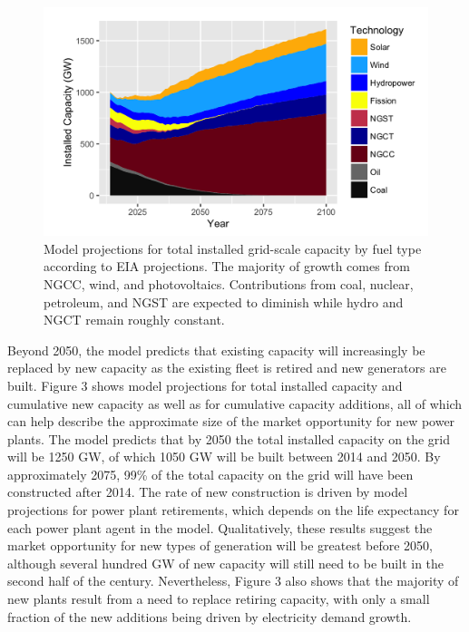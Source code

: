 \documentclass[preprint, 12pt]{elsarticle}
\begin{document}
\begin{figure}
\begin{center}
\includegraphics[scale=.35]{Fig4_2.png}
\end{center}
\caption{Model projections for total installed grid-scale capacity by fuel type according to EIA projections. The majority of growth comes from NGCC, wind, and photovoltaics. Contributions from coal, nuclear, petroleum, and NGST are expected to diminish while hydro and NGCT remain roughly constant.}
\end{figure}

Beyond 2050, the model predicts that existing capacity will increasingly be replaced by new capacity as the existing fleet is retired and new generators are built. Figure 3 shows model projections for total installed capacity and cumulative new capacity as well as for cumulative capacity additions, all of which can help describe the approximate size of the market opportunity for new power plants. The model predicts that by 2050 the total installed capacity on the grid will be 1250 GW, of which 1050 GW will be built between 2014 and 2050. By approximately 2075, 99\% of the total capacity on the grid will have been constructed after 2014. The rate of new construction is driven by model projections for power plant retirements, which depends on the life expectancy for each power plant agent in the model. Qualitatively, these results suggest the market opportunity for new types of generation will be greatest before 2050, although several hundred GW of new capacity will still need to be built in the second half of the century. Nevertheless, Figure 3 also shows that the majority of new plants result from a need to replace retiring capacity, with only a small fraction of the new additions being driven by electricity demand growth.
\end{document}
